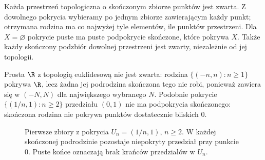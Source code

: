 \begin{przyklad}
\label{ex:topog-zwartosc-skonczone}
Każda przestrzeń topologiczna o skończonym zbiorze
punktów jest zwarta. Z dowolnego pokrycia wybieramy
po jednym zbiorze zawierającym każdy punkt; otrzymana
rodzina ma co najwyżej tyle elementów, ile punktów
przestrzeni. Dla $X=\varnothing$ pokrycie puste
ma puste podpokrycie skończone, które pokrywa $X$.
Także każdy skończony podzbiór dowolnej przestrzeni
jest zwarty, niezależnie od jej topologii.
\end{przyklad}

\begin{przyklad}
\label{ex:topog-zwartosc-przeciwwklady}
Prosta $\R$ z topologią euklidesową nie jest zwarta:
rodzina $\{(-n,n):n\ge1\}$ pokrywa $\R$, lecz żadna
jej podrodzina skończona tego nie robi, ponieważ
zawiera się w $(-N,N)$ dla największego wybranego $N$.
Podobnie pokrycie $\{(1/n,1):n\ge2\}$ przedziału
$(0,1)$ nie ma podpokrycia skończonego: skończona
rodzina nie pokrywa punktów dostatecznie bliskich $0$.
\end{przyklad}

\begin{figure}[htbp]
\centering
{}
\caption{Pierwsze zbiory z pokrycia $U_n=(1/n,1)$, $n\ge2$.
W każdej skończonej podrodzinie pozostaje niepokryty
przedział przy punkcie $0$. Puste końce oznaczają
brak krańców przedziałów w $U_n$.}
\label{fig:topog-zwartosc-pokrycie-otwarte}
\end{figure}

